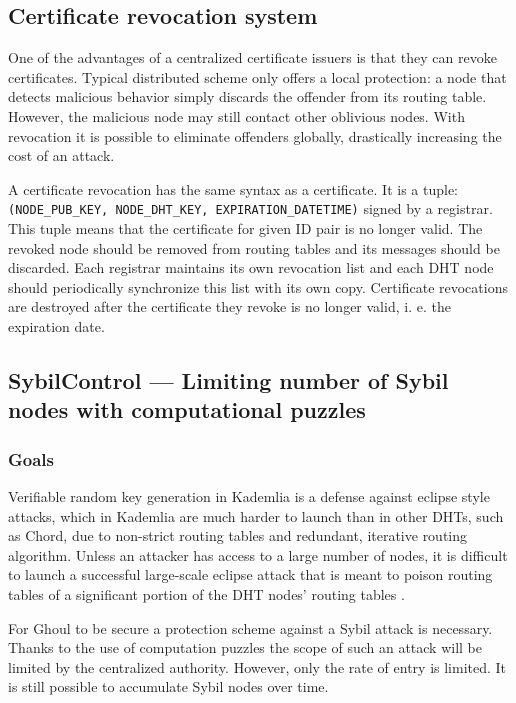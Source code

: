 \subsection{Certificate revocation system}

One of the advantages of a centralized certificate issuers is that they can
revoke certificates. Typical distributed scheme only offers a local protection:
a node that detects malicious behavior simply discards the offender from its
routing table. However, the malicious node may still contact other oblivious
nodes. With revocation it is possible to eliminate offenders globally,
drastically increasing the cost of an attack.

A certificate revocation has the same syntax as a certificate. It is a
tuple:
\texttt{(NODE\_PUB\_KEY, NODE\_DHT\_KEY, EXPIRATION\_DATETIME)}
signed by a registrar. This tuple means that the certificate for given ID pair
is no longer valid. The revoked node should be removed from routing tables and
its messages should be discarded. Each registrar maintains its own revocation
list and each DHT node should periodically synchronize this list with its own
copy.
Certificate revocations are destroyed after the certificate they revoke is no
longer valid, i. e. the expiration date.

\subsection{SybilControl --- Limiting number of Sybil nodes with computational
puzzles}
\subsubsection{Goals}
  Verifiable random key generation in Kademlia is a defense against eclipse
  style attacks, which in Kademlia are much harder to launch than in other
  DHTs, such as Chord, due to non-strict routing tables and redundant, iterative
  routing algorithm.
  Unless an attacker has access to a large number of nodes, it is difficult to
  launch a successful large-scale eclipse attack that is meant to poison
  routing tables of a significant portion of the DHT nodes' routing tables
  \cite{mac09}.

  For Ghoul to be secure a protection scheme against a Sybil attack is
  necessary.
  Thanks to the use of computation puzzles the scope of such an attack will be
  limited by the centralized authority.
  However, only the rate of entry is limited.
  It is still possible to accumulate Sybil nodes over time.

